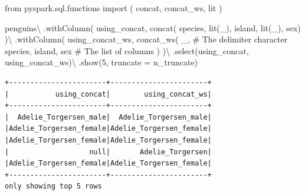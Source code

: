 \documentclass[
  11pt,
  letterpaper,
  DIV=11,
  numbers=noendperiod]{scrreprt}
\newenvironment{Shaded}{\begin{snugshade}}{\end{snugshade}}
\newcommand{\CommentTok}[1]{\textcolor[rgb]{0.37,0.37,0.37}{#1}}
\newcommand{\DecValTok}[1]{\textcolor[rgb]{0.68,0.00,0.00}{#1}}
\newcommand{\ImportTok}[1]{\textcolor[rgb]{0.00,0.46,0.62}{#1}}
\newcommand{\NormalTok}[1]{\textcolor[rgb]{0.00,0.23,0.31}{#1}}
\newcommand{\OperatorTok}[1]{\textcolor[rgb]{0.37,0.37,0.37}{#1}}
\newcommand{\StringTok}[1]{\textcolor[rgb]{0.13,0.47,0.30}{#1}}
\begin{document}
\begin{Shaded}
\begin{Highlighting}[]
\ImportTok{from}\NormalTok{ pyspark.sql.functions }\ImportTok{import}\NormalTok{ (}
\NormalTok{    concat,}
\NormalTok{    concat\_ws,}
\NormalTok{    lit}
\NormalTok{)}

\NormalTok{penguins}\OperatorTok{\textbackslash{}}
\NormalTok{    .withColumn(}
        \StringTok{\textquotesingle{}using\_concat\textquotesingle{}}\NormalTok{,}
\NormalTok{        concat(}
            \StringTok{\textquotesingle{}species\textquotesingle{}}\NormalTok{, lit(}\StringTok{\textquotesingle{}\_\textquotesingle{}}\NormalTok{), }\StringTok{\textquotesingle{}island\textquotesingle{}}\NormalTok{,}
\NormalTok{            lit(}\StringTok{\textquotesingle{}\_\textquotesingle{}}\NormalTok{), }\StringTok{\textquotesingle{}sex\textquotesingle{}}\NormalTok{)}
\NormalTok{    )}\OperatorTok{\textbackslash{}}
\NormalTok{    .withColumn(}
        \StringTok{\textquotesingle{}using\_concat\_ws\textquotesingle{}}\NormalTok{,}
\NormalTok{        concat\_ws(}
            \StringTok{\textquotesingle{}\_\textquotesingle{}}\NormalTok{, }\CommentTok{\# The delimiter character}
            \StringTok{\textquotesingle{}species\textquotesingle{}}\NormalTok{, }\StringTok{\textquotesingle{}island\textquotesingle{}}\NormalTok{, }\StringTok{\textquotesingle{}sex\textquotesingle{}} \CommentTok{\# The list of columns}
\NormalTok{        )}
\NormalTok{    )}\OperatorTok{\textbackslash{}}
\NormalTok{    .select(}\StringTok{\textquotesingle{}using\_concat\textquotesingle{}}\NormalTok{, }\StringTok{\textquotesingle{}using\_concat\_ws\textquotesingle{}}\NormalTok{)}\OperatorTok{\textbackslash{}}
\NormalTok{    .show(}\DecValTok{5}\NormalTok{, truncate }\OperatorTok{=}\NormalTok{ n\_truncate)}
\end{Highlighting}
\end{Shaded}

\begin{verbatim}
+-----------------------+-----------------------+
|           using_concat|        using_concat_ws|
+-----------------------+-----------------------+
|  Adelie_Torgersen_male|  Adelie_Torgersen_male|
|Adelie_Torgersen_female|Adelie_Torgersen_female|
|Adelie_Torgersen_female|Adelie_Torgersen_female|
|                   null|       Adelie_Torgersen|
|Adelie_Torgersen_female|Adelie_Torgersen_female|
+-----------------------+-----------------------+
only showing top 5 rows
\end{verbatim}
\end{document}

